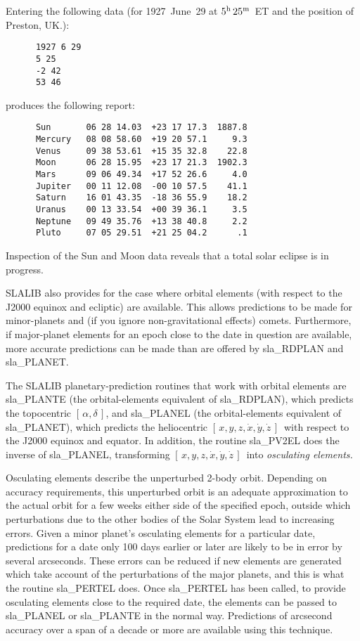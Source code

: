 \documentclass[11pt,twoside]{article}
\newcommand{\radec}     {$[\,\alpha,\delta\,]$}
\newcommand{\xyzxyzd}   {$[\,x,y,z,\dot{x},\dot{y},\dot{z}\,]$}
\begin{document}
Entering the following data (for 1927~June~29 at $5^{\rm h}\,25^{\rm m}$~ET
and the position of Preston, UK.):
\begin{verbatim}
      1927 6 29
      5 25
      -2 42
      53 46
\end{verbatim}
produces the following report:
\begin{verbatim}
      Sun       06 28 14.03  +23 17 17.3  1887.8
      Mercury   08 08 58.60  +19 20 57.1     9.3
      Venus     09 38 53.61  +15 35 32.8    22.8
      Moon      06 28 15.95  +23 17 21.3  1902.3
      Mars      09 06 49.34  +17 52 26.6     4.0
      Jupiter   00 11 12.08  -00 10 57.5    41.1
      Saturn    16 01 43.35  -18 36 55.9    18.2
      Uranus    00 13 33.54  +00 39 36.1     3.5
      Neptune   09 49 35.76  +13 38 40.8     2.2
      Pluto     07 05 29.51  +21 25 04.2      .1
\end{verbatim}
Inspection of the Sun and Moon data reveals that
a total solar eclipse is in progress.

SLALIB also provides for the case where orbital elements (with respect
to the J2000 equinox and ecliptic)
are available.  This allows predictions to be made for minor-planets and
(if you ignore non-gravitational effects)
comets.  Furthermore, if major-planet elements for an epoch close to the date
in question are available, more accurate predictions can be made than
are offered by
sla\_RDPLAN and
sla\_PLANET.

The SLALIB planetary-prediction
routines that work with orbital elements are
sla\_PLANTE (the orbital-elements equivalent of
sla\_RDPLAN), which predicts the topocentric \radec, and
sla\_PLANEL (the orbital-elements equivalent of
sla\_PLANET), which predicts the heliocentric \xyzxyzd\ with respect to the
J2000 equinox and equator.  In addition, the routine
sla\_PV2EL does the inverse of
sla\_PLANEL, transforming \xyzxyzd\ into {\it osculating elements.}

Osculating elements describe the unperturbed 2-body orbit.  Depending
on accuracy requirements, this unperturbed orbit is an
adequate approximation to the actual orbit for a few weeks either
side of the specified epoch, outside which perturbations due to
the other bodies of the Solar System lead to
increasing errors.  Given a minor planet's osculating elements for
a particular date, predictions for a date only
100 days earlier or later
are likely to be in error by several arcseconds.
These errors can
be reduced if new elements are generated which take account of
the perturbations of the major planets, and this is what the routine
sla\_PERTEL does.  Once
sla\_PERTEL has been called, to provide osculating elements
close to the required date, the elements can be passed to
sla\_PLANEL or
sla\_PLANTE in the normal way.  Predictions of arcsecond accuracy
over a span of a decade or more are available using this
technique.
\end{document}
